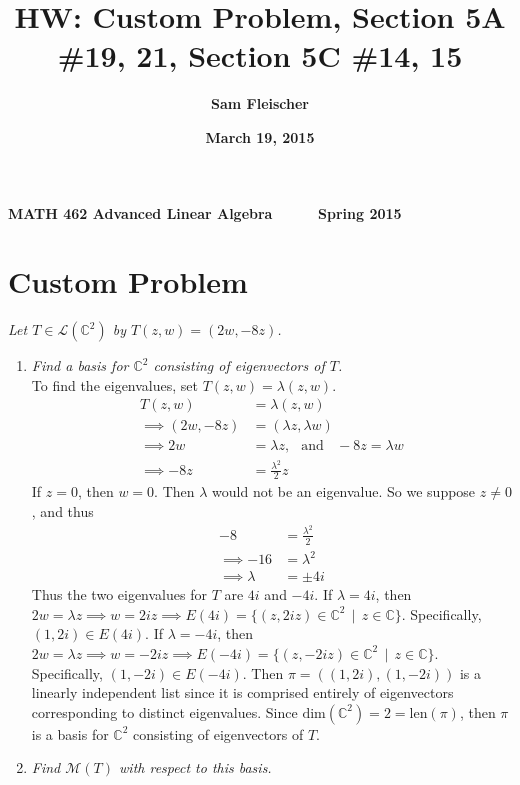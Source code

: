 \documentclass[12pt]{article}
\title{\bf HW: Custom Problem, Section 5A \#19, 21, Section 5C \#14, 15}
\author{\bf Sam Fleischer}
\date{\bf March 19, 2015}
\newcommand{\suchthat}{\, \mid \,}
\begin{document}
{\bf MATH 462 \hfill Advanced Linear Algebra \ \ \ \ \ \hfill Spring 2015} 

{\let\newpage\relax\maketitle}

\section*{Custom Problem}
{\it Let $T \in \mathcal{L}(\mathbb{C}^2)$ by $T(z, w) = (2w, -8z)$.}
	\begin{enumerate}[\it\ \ (a)\ \ ]
		\item {\it Find a basis for $\mathbb{C}^2$ consisting of eigenvectors of $T$.}\\
		
		\noindent To find the eigenvalues, set $T(z, w) = \lambda(z, w)$.
		\begin{align*}
			T(z, w) &= \lambda(z, w) \\
			\implies (2w, -8z) &= (\lambda z, \lambda w) \\
			\implies 2w &= \lambda z\text{,} \ \ \ \ \text{and}\ \ \ \ -8z = \lambda w \\
			\implies -8z &= \frac{\lambda^2}{2}z
		\end{align*}
		If $z = 0$, then $w = 0$.  Then $\lambda$ would not be an eigenvalue.  So we suppose $z \neq 0$, and thus
		\begin{align*}
			-8 &= \frac{\lambda^2}{2} \\
			\implies -16 &= \lambda^2 \\
			\implies \lambda &= \pm 4i
		\end{align*}
		Thus the two eigenvalues for $T$ are $4i$ and $-4i$.  If $\lambda = 4i$, then $2w = \lambda z \implies w = 2iz \implies E(4i) = \{(z, 2iz) \in \mathbb{C}^2 \suchthat z \in \mathbb{C}\}$.  Specifically, $(1, 2i) \in E(4i)$.  If $\lambda = -4i$, then $2w = \lambda z \implies w = -2iz \implies E(-4i) = \{(z, -2iz) \in \mathbb{C}^2 \suchthat z \in \mathbb{C}\}$.  Specifically, $(1, -2i) \in E(-4i)$.  Then $\pi = ((1, 2i), (1, -2i))$ is a linearly independent list since it is comprised entirely of eigenvectors corresponding to distinct eigenvalues.  Since $\text{dim}(\mathbb{C}^2) = 2 = \text{len}(\pi)$, then $\pi$ is a basis for $\mathbb{C}^2$ consisting of eigenvectors of $T$.
		\item {\it Find $\mathcal{M}(T)$ with respect to this basis.}\\
		

\end{enumerate}
\end{document}
